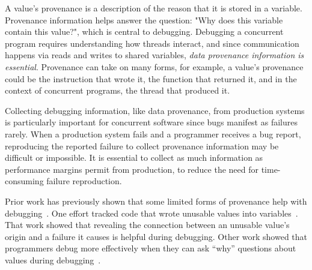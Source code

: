 \documentclass[preprint,9pt]{sigplanconf}
\begin{document}

A value's provenance is a description of the reason that it is stored in a
variable. Provenance information helps answer the question: "Why does this
variable contain this value?", which is central to debugging. Debugging a
concurrent program requires understanding how threads interact, and since
communication happens via reads and writes to shared variables, {\em data
provenance information is essential}. Provenance can take on many forms, for
example, a value's provenance could be the instruction that wrote it, the
function that returned it, and in the context of concurrent programs, the
thread that produced it.


Collecting debugging information, like data provenance, from production
systems is particularly important for concurrent software since bugs
manifest as failures rarely. When a production system fails and a programmer
receives a bug report, reproducing the reported failure to collect provenance
information may be difficult or impossible. It is essential to collect as much
information as performance margins permit from production, to reduce the need
for time-consuming failure reproduction.

Prior work has previously shown that some limited forms of provenance help
with debugging~\cite{badapples, whylineicse, tipslicingsurvey}. One effort
tracked code that wrote unusable values into variables~\cite{badapples}. That
work showed that revealing the connection between an unusable value's origin
and a failure it causes is helpful during debugging. Other work showed that
programmers debug more effectively when they can ask ``why'' questions about
values during debugging~\cite{tipslicingsurvey,whylineicse}. 
\end{document}
